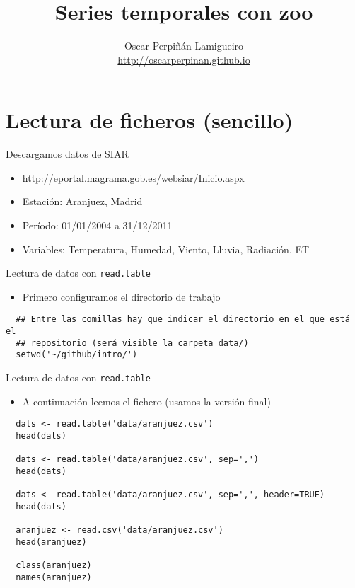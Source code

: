 \documentclass[xcolor={usenames,svgnames,dvipsnames}]{beamer}
\author{Oscar Perpiñán Lamigueiro \\ \url{http://oscarperpinan.github.io}}
\date{}
\title{Series temporales con zoo}
\begin{document}
\maketitle


\section{Lectura de ficheros (sencillo)}
\label{sec-1}
\begin{frame}[label=sec-1-1]{Descargamos datos de SIAR}
\begin{itemize}
\item \url{http://eportal.magrama.gob.es/websiar/Inicio.aspx}
\item \alert{Estación}: Aranjuez, Madrid
\item \alert{Período}: 01/01/2004 a 31/12/2011
\item \alert{Variables}: Temperatura, Humedad, Viento, Lluvia, Radiación, ET
\end{itemize}
\end{frame}

\begin{frame}[fragile,label=sec-1-2]{Lectura de datos con \texttt{read.table}}
 \begin{itemize}
\item Primero configuramos el directorio de trabajo
\end{itemize}
\lstset{language=R,label= ,caption= ,numbers=none}
\begin{lstlisting}
  ## Entre las comillas hay que indicar el directorio en el que está el
  ## repositorio (será visible la carpeta data/)
  setwd('~/github/intro/')
\end{lstlisting}
\end{frame}

\begin{frame}[fragile,label=sec-1-3]{Lectura de datos con \texttt{read.table}}
 \begin{itemize}
\item A continuación leemos el fichero (usamos la versión final)
\end{itemize}
\lstset{language=R,label= ,caption= ,numbers=none}
\begin{lstlisting}
  dats <- read.table('data/aranjuez.csv')
  head(dats)
  
  dats <- read.table('data/aranjuez.csv', sep=',')
  head(dats)
  
  dats <- read.table('data/aranjuez.csv', sep=',', header=TRUE)
  head(dats)
  
  aranjuez <- read.csv('data/aranjuez.csv')
  head(aranjuez)
  
  class(aranjuez)
  names(aranjuez)
\end{lstlisting}
\end{frame}
\end{document}
